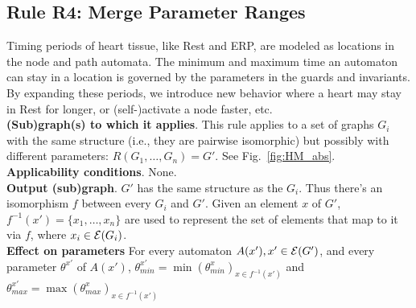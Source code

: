 \subsection{Rule R4: Merge Parameter Ranges}
Timing periods of heart tissue, like Rest and ERP, are modeled as locations in the node and path automata. 
The minimum and maximum time an automaton can stay in a location is governed by the parameters in the guards and invariants. 
By expanding these periods, we introduce new behavior where a heart may stay in Rest for longer, or (self-)activate a node faster, etc.
\\
\textbf{(Sub)graph(s) to which it applies}.
This rule applies to a set of graphs $G_i$ with the same structure (i.e., they are pairwise isomorphic) but possibly with different parameters: $R(G_1,\ldots,G_n) = G'$.
See Fig.~\ref{fig:HM_abs}.\\
\textbf{Applicability conditions}.
None.\\
\textbf{Output (sub)graph}.
$G'$ has the same structure as the $G_i$.
Thus there's an isomorphism $f$ between every $G_i$ and $G'$.
Given an element $x$ of $G'$, $f^{-1}(x') = \{x_1,\dots,x_n\}$ are used to represent the set of elements that map to it via $f$, where $x_i \in \mathcal{E}(G_i)$.\\
\textbf{Effect on parameters}
For every automaton $A(x'), x' \in \mathcal{E}(G')$, and every parameter $\theta^{x'}$ of $A(x')$, 
$\theta_{min}^{x'} = \min(\theta^x_{min})_{x \in f^{-1}(x') }$ and 
$\theta_{max}^{x'} = \max(\theta^x_{max})_{x \in f^{-1}(x') }$